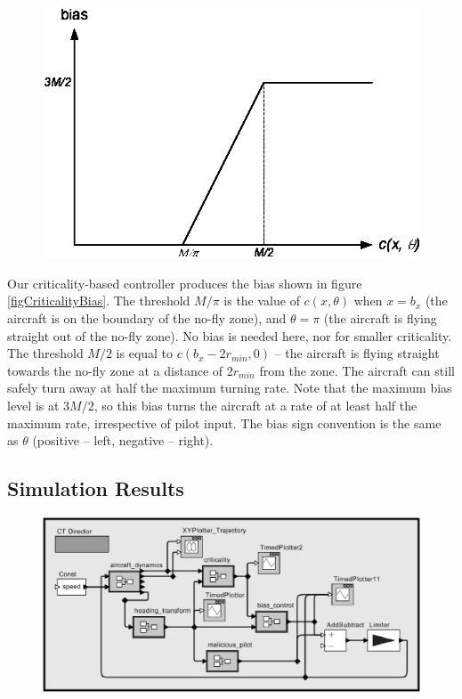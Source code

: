 \documentclass[11pt]{article}
\begin{document}
\begin{figure}[btp]
\centering
\includegraphics{criticalityBias.eps}
\end{figure}

Our criticality-based controller produces the bias shown in figure
\ref{figCriticalityBias}.  The threshold $M/\pi$ is the value of $c(x,
\theta)$ when $x = b_{x}$ (the aircraft is on the boundary of the
no-fly zone), and $\theta = \pi$ (the aircraft is flying straight out
of the no-fly zone). No bias is needed here, nor for smaller
criticality.  The threshold $M/2$ is equal to $c(b_{x}-2r_{min}, 0)$
-- the aircraft is flying straight towards the no-fly zone at a
distance of $2r_{min}$ from the zone.  The aircraft can still safely
turn away at half the maximum turning rate. Note that the maximum bias
level is at $3M/2$, so this bias turns the aircraft at a rate of at
least half the maximum rate, irrespective of pilot input. The bias
sign convention is the same as $\theta$ (positive -- left, negative --
right).


\subsection{Simulation Results}

\begin{figure}[btp]
\centering
\includegraphics[width=5in]{criticalityTopLevel.eps}
\end{figure}
\end{document}
